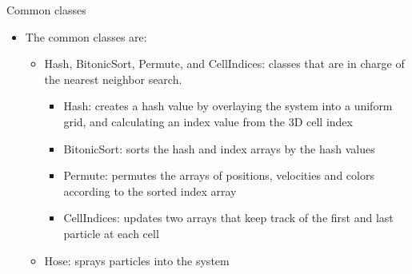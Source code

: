\documentclass[red]{beamer}
\begin{document}


\begin{frame}{Common classes}
	\begin{itemize}
		\pause \item The common classes are:
			\begin{itemize}
				\pause \item Hash, BitonicSort, Permute, and CellIndices: classes that are in charge of the nearest neighbor search.
					\begin{itemize}
						\pause \item Hash: creates a hash value by overlaying the system into a uniform grid, and calculating an index value from the 3D cell index
						\pause \item BitonicSort: sorts the hash and index arrays by the hash values
						\pause \item Permute: permutes the arrays of positions, velocities and colors according to the sorted index array
						\pause \item CellIndices: updates two arrays that keep track of the first and last particle at each cell
					\end{itemize}
				\pause \item Hose: sprays particles into the system
			\end{itemize}
	\end{itemize}
\end{frame}
\end{document}
